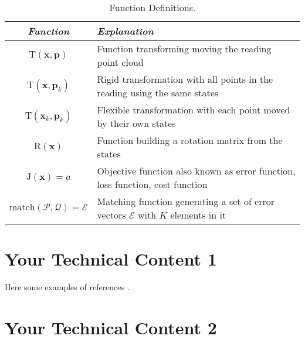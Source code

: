 \documentclass[10pt,letterpaper,oneside]{article}
\begin{document}
\begin{table}[htbp]
\centering
\caption{Function Definitions.}
\label{tab:functions}
\begin{tabu}{cX}

\toprule
\emph{Function} & \emph{Explanation} \\
\midrule

$\mathrm{T}(\bm{x}, \bm{p})$ & Function transforming moving the reading point cloud \\
$\mathrm{T}(\bm{x}, \bm{p}_k)$ & Rigid transformation with all points in the reading using the same states\\
$\mathrm{T}(\bm{x}_k, \bm{p}_k)$ & Flexible transformation with each point moved by their own states\\
$\mathrm{R}(\bm{x})$ & Function building a rotation matrix from the states \\
$\mathrm{J}(\bm{x}) = a$ & Objective function also known as error function, loss function, cost function\\
$\mathrm{match}(\mathcal{P}, \mathcal{Q}) = \mathcal{E}$ & Matching function generating a set of error vectors $\mathcal{E}$ with $K$ elements in it\\

\bottomrule

\end{tabu}
\end{table}

\newpage
\section{Your Technical Content 1}%
Here some examples of references \cite{Pomerleau2013,Pomerleau2014}.
\lightlipsum[1-2]

\newpage
\section{Your Technical Content 2}%
\lightlipsum[1-2]

\printbibliography
\end{document}
